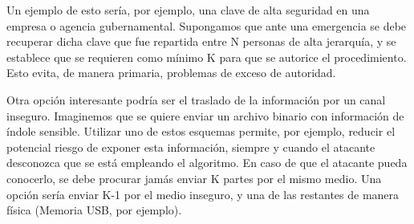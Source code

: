 \documentclass[11pt]{scrartcl} %
\begin{document}
Un ejemplo de esto sería, por ejemplo, una clave de alta seguridad en una empresa o agencia gubernamental. Supongamos que ante una emergencia se debe recuperar dicha clave que fue repartida entre N personas de alta jerarquía, y se establece que se requieren como mínimo K para que se autorice el procedimiento. Esto evita, de manera primaria, problemas de exceso de autoridad.

Otra opción interesante podría ser el traslado de la información por un canal inseguro. Imaginemos que se quiere enviar un archivo binario con información de índole sensible. Utilizar uno de estos esquemas permite, por ejemplo, reducir el potencial riesgo de exponer esta información, siempre y cuando el atacante desconozca que se está empleando el algoritmo. En caso de que el atacante pueda conocerlo, se debe procurar jamás enviar K partes por el mismo medio. Una opción sería enviar K-1 por el medio inseguro, y una de las restantes de manera física (Memoria USB, por ejemplo).

\end{document}
